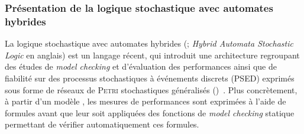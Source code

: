         \subsubsection{Présentation de la logique stochastique avec automates hybrides}
La logique stochastique avec automates hybrides (\lsah; \textit{Hybrid Automata Stochastic Logic} en anglais) est un langage récent, qui introduit une architecture regroupant des études de \textit{model checking} et d'évaluation des performances ainsi que de fiabilité sur des processus stochastiques à événements discrets (PSED) exprimés sous forme de réseaux de \textsc{Petri} stochastiques généralisés (\rpsg)~\cite{BDDHP11hasl}.
Plus concrètement, à partir d'un modèle \rpsg, les mesures de performances sont exprimées à l'aide de formules \lsah avant que leur soit appliquées des fonctions de \textit{model checking} statique permettant de vérifier automatiquement ces formules.

